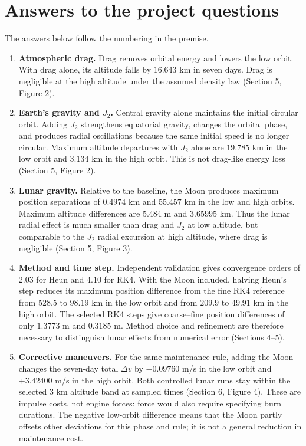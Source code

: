 \documentclass[11pt]{article}
\begin{document}
\section{Answers to the project questions}
The answers below follow the numbering in the premise.
\begin{enumerate}
\item \textbf{Atmospheric drag.} Drag removes orbital energy and lowers the low orbit. With drag alone, its altitude falls by $16.643$ km in seven days. Drag is negligible at the high altitude under the assumed density law (Section 5, Figure 2).

\item \textbf{Earth's gravity and $J_2$.} Central gravity alone maintains the initial circular orbit. Adding $J_2$ strengthens equatorial gravity, changes the orbital phase, and produces radial oscillations because the same initial speed is no longer circular. Maximum altitude departures with $J_2$ alone are $19.785$ km in the low orbit and $3.134$ km in the high orbit. This is not drag-like energy loss (Section 5, Figure 2).

\item \textbf{Lunar gravity.} Relative to the baseline, the Moon produces maximum position separations of $0.4974$ km and $55.457$ km in the low and high orbits. Maximum altitude differences are $5.484$ m and $3.65995$ km. Thus the lunar radial effect is much smaller than drag and $J_2$ at low altitude, but comparable to the $J_2$ radial excursion at high altitude, where drag is negligible (Section 5, Figure 3).

\item \textbf{Method and time step.} Independent validation gives convergence orders of $2.03$ for Heun and $4.10$ for RK4. With the Moon included, halving Heun's step reduces its maximum position difference from the fine RK4 reference from $528.5$ to $98.19$ km in the low orbit and from $209.9$ to $49.91$ km in the high orbit. The selected RK4 steps give coarse--fine position differences of only $1.3773$ m and $0.3185$ m. Method choice and refinement are therefore necessary to distinguish lunar effects from numerical error (Sections 4--5).

\item \textbf{Corrective maneuvers.} For the same maintenance rule, adding the Moon changes the seven-day total $\Delta v$ by $-0.09760$ m/s in the low orbit and $+3.42400$ m/s in the high orbit. Both controlled lunar runs stay within the selected $3$ km altitude band at sampled times (Section 6, Figure 4). These are impulse costs, not engine forces: force would also require specifying burn durations. The negative low-orbit difference means that the Moon partly offsets other deviations for this phase and rule; it is not a general reduction in maintenance cost.
\end{enumerate}
\end{document}
